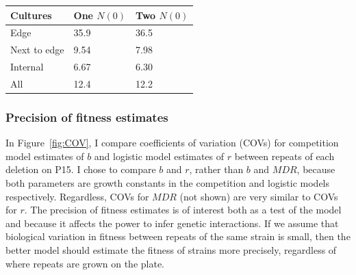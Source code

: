 \begin{multicols}{2}
\begin{center}
  \begin{tabular}{l l l}
    \hline
    Cultures     & One \(N(0)\)  & Two \(N(0)\) \\
    \hline
    Edge         & 35.9    & 36.5\\
    Next to edge & 9.54    & 7.98\\
    Internal     & 6.67    & 6.30\\
    All          & 12.4    & 12.2\\
    \hline
  \end{tabular}
  \label{tab:corner}
\end{center}




\subsubsection{Precision of fitness estimates}
\label{sec:cross_plate_validation}


In Figure~\ref{fig:COV}, I compare coefficients of variation (COVs)
for competition model estimates of \(b\) and logistic model estimates
of \(r\) between repeats of each deletion on P15. I chose to compare
\(b\) and \(r\), rather than \(b\) and \(MDR\), because both
parameters are growth constants in the competition and logistic models
respectively. Regardless, COVs for \(MDR\) (not shown) are very
similar to COVs for \(r\). The precision of fitness estimates is of
interest both as a test of the model and because it affects the power
to infer genetic interactions. If we assume that biological variation
in fitness between repeats of the same strain is small, then the
better model should estimate the fitness of strains more precisely,
regardless of where repeats are grown on the plate.


\end{multicols}

